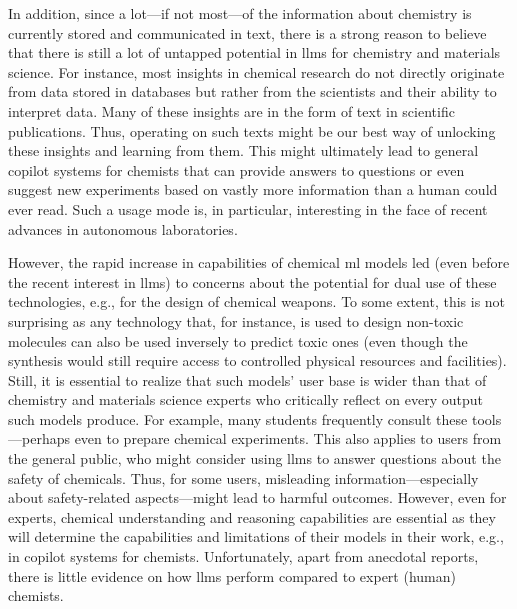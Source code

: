 \documentclass[11pt, oneside]{article}
\begin{document}
\begin{refsection}
In addition, since a lot---if not most---of the information about chemistry is currently stored and communicated in text, there is a strong reason to believe that there is still a lot of untapped potential in \glspl{llm} for chemistry and materials science.\autocite{miret2024llms}
For instance, most insights in chemical research do not directly originate from data stored in databases but rather from the scientists and their ability to interpret data. 
Many of these insights are in the form of text in scientific publications. 
Thus, operating on such texts might be our best way of unlocking these insights and learning from them.
This might ultimately lead to general copilot systems for chemists that can provide answers to questions or even suggest new experiments based on vastly more information than a human could ever read.
Such a usage mode is, in particular, interesting in the face of recent advances in autonomous laboratories.\autocite{Boiko_2023, bran2023chemcrow, darvish2024organa, granda2018controlling, Angello_2022, coley2019robotic, Burger_2020, seifrid2022autonomous}


However, the rapid increase in capabilities of chemical \gls{ml} models led (even before the recent interest in \glspl{llm}) to concerns about the potential for dual use of these technologies, e.g., for the design of chemical weapons.\autocite{gopal2023releasing, ganguli2022red, Urbina_2022, campbell2023censoring, moulange2023towards, urbina2022teachable}
To some extent, this is not surprising as any technology that, for instance, is used to design non-toxic molecules can also be used inversely to predict toxic ones (even though the synthesis would still require access to controlled physical resources and facilities).
Still, it is essential to realize that such models' user base is wider than that of chemistry and materials science experts who critically reflect on every output such models produce. 
For example, many students frequently consult these tools---perhaps even to prepare chemical experiments.\autocite{Intelligent.com_2023}
This also applies to users from the general public, who might consider using \glspl{llm} to answer questions about the safety of chemicals.
Thus, for some users, misleading information---especially about safety-related aspects---might lead to harmful outcomes. 
However, even for experts, chemical understanding and reasoning capabilities are essential as they will determine the capabilities and limitations of their models in their work, e.g., in copilot systems for chemists.
Unfortunately, apart from anecdotal reports, there is little evidence on how \glspl{llm} perform compared to expert (human) chemists.


\end{refsection}
\end{document}
